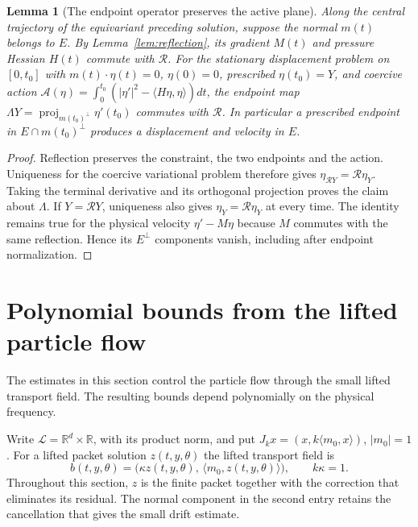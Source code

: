 \documentclass[11pt]{article}
\newcommand{\R}{\mathbb R}
\newtheorem{lemma}[theorem]{Lemma}
\theoremstyle{definition}
\begin{document}
\begin{lemma}[The endpoint operator preserves the active plane]\label{lem:endpoint-symmetry}
Along the central trajectory of the equivariant preceding solution,
suppose the normal
$m(t)$ belongs to $E$. By Lemma~\ref{lem:reflection}, its gradient $M(t)$
and pressure Hessian $H(t)$ commute with $\mathcal R$. For the
stationary displacement problem on $[0,t_0]$ with
$m(t)\cdot\eta(t)=0$, $\eta(0)=0$, prescribed $\eta(t_0)=Y$, and
coercive action
$\mathcal A(\eta)=\int_0^{t_0}(|\eta'|^2-\langle H\eta,\eta\rangle)dt$,
the endpoint map $\Lambda Y=\operatorname{proj}_{m(t_0)^\perp}\eta'(t_0)$
commutes with $\mathcal R$. In particular a prescribed endpoint in
$E\cap m(t_0)^\perp$ produces a displacement and velocity in $E$.
\end{lemma}
\begin{proof}
Reflection preserves the constraint, the two endpoints and the action.
Uniqueness for the coercive variational problem therefore gives
$\eta_{\mathcal RY}=\mathcal R\eta_Y$. Taking the terminal derivative
and its orthogonal projection proves the claim about $\Lambda$.
If $Y=\mathcal RY$, uniqueness also gives
$\eta_Y=\mathcal R\eta_Y$ at every time. The identity remains true for
the physical velocity $\eta'-M\eta$ because $M$ commutes with the same
reflection. Hence its $E^\perp$ components vanish, including after endpoint
normalization.
\end{proof}
\section{Polynomial bounds from the lifted particle flow}
The estimates in this section control the particle flow through the
small lifted transport field. The resulting bounds depend polynomially
on the physical frequency.

Write $\mathcal L=\R^d\times\R$, with its product norm, and put
$J_kx=(x,k\langle m_0,x\rangle)$, $|m_0|=1$. For a lifted packet solution
$z(t,y,\theta)$ the lifted transport field is
\[
 b(t,y,\theta)=\bigl(\kappa z(t,y,\theta),\,
                         \langle m_0,z(t,y,\theta)\rangle\bigr),
 \qquad k\kappa=1.
\]
Throughout this section, $z$ is the finite packet together with the
correction that eliminates its residual. The normal component in
the second entry retains the cancellation that gives the small drift estimate.
\end{document}
